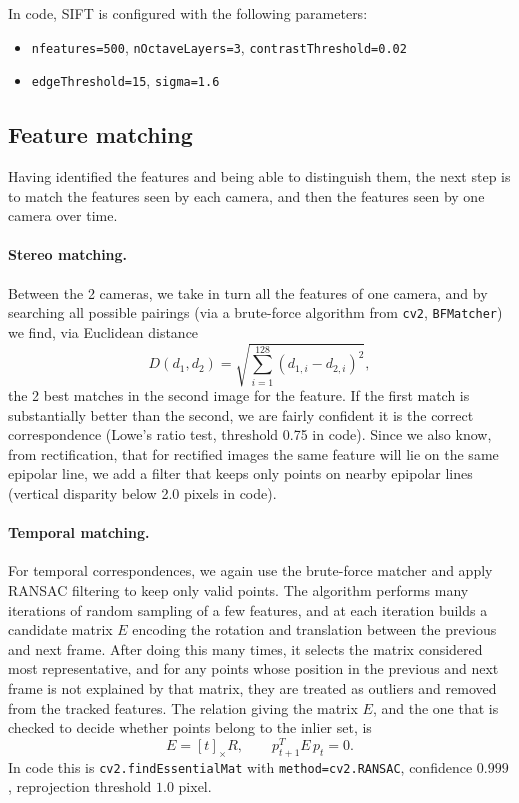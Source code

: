 \documentclass[11pt]{article}
\begin{document}
In code, SIFT is configured with the following parameters:
\begin{itemize}[leftmargin=*, nosep]
  \item \texttt{nfeatures=500}, \texttt{nOctaveLayers=3}, \texttt{contrastThreshold=0.02}
  \item \texttt{edgeThreshold=15}, \texttt{sigma=1.6}
\end{itemize}

\subsection{Feature matching}
Having identified the features and being able to distinguish them, the next step is to match the
features seen by each camera, and then the features seen by one camera over time.

\paragraph{Stereo matching.} Between the 2 cameras, we take in turn all the features of one camera, and
by searching all possible pairings (via a brute-force algorithm from \texttt{cv2}, \texttt{BFMatcher})
we find, via Euclidean distance
\[
D(d_1,d_2) = \sqrt{\sum_{i=1}^{128}(d_{1,i}-d_{2,i})^2},
\]
the 2 best matches in the second image for the feature. If the first match is substantially better than
the second, we are fairly confident it is the correct correspondence (Lowe's ratio test, threshold 0.75
in code). Since we also know, from rectification, that for rectified images the same feature will lie
on the same epipolar line, we add a filter that keeps only points on nearby epipolar lines (vertical
disparity below 2.0 pixels in code).

\paragraph{Temporal matching.} For temporal correspondences, we again use the brute-force matcher and
apply RANSAC filtering to keep only valid points. The algorithm performs many iterations of random
sampling of a few features, and at each iteration builds a candidate matrix $E$ encoding the rotation
and translation between the previous and next frame. After doing this many times, it selects the matrix
considered most representative, and for any points whose position in the previous and next frame is
not explained by that matrix, they are treated as outliers and removed from the tracked features. The
relation giving the matrix $E$, and the one that is checked to decide whether points belong to the
inlier set, is
\[
E = [t]_\times R, \qquad p_{t+1}^T E\, p_t = 0.
\]
In code this is \texttt{cv2.findEssentialMat} with \texttt{method=cv2.RANSAC}, confidence $0.999$,
reprojection threshold $1.0$ pixel.
\end{document}

